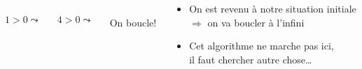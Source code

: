 \begin{columns}
  \begin{column}{.15\linewidth}\center
      {}\\
     {\small $1>0\leadsto$ }
  \end{column}

  \begin{column}{.15\linewidth}\center
      {}\\
     {\small $4>0\leadsto$ }
  \end{column}

  \begin{column}{.15\linewidth}\center
      {}\\
     {\small On boucle!}
  \end{column}

  \begin{column}{.51\linewidth}
    \begin{itemize}
    \item On est revenu à notre situation initiale\\
      $\Rightarrow$ on va boucler à l'infini
    \item Cet algorithme ne marche pas ici, \\il faut chercher autre chose\ldots
    \end{itemize}
  \end{column}

\end{columns}
